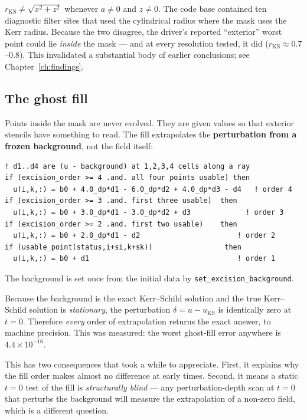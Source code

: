 \documentclass[11pt,openany]{book}
\begin{document}
\gotcha
$r_{\mathrm{KS}} \neq \sqrt{x^2+z^2}$ whenever $a\neq 0$ and $z \neq 0$. The
code base contained ten diagnostic filter sites that used the cylindrical
radius where the mask uses the Kerr radius. Because the two disagree, the
driver's reported ``exterior'' worst point could lie \emph{inside} the mask ---
and at every resolution tested, it did ($r_{\mathrm{KS}} \approx 0.7$--$0.8$).
This invalidated a substantial body of earlier conclusions; see
Chapter~\ref{ch:findings}.

\subsection{The ghost fill}

Points inside the mask are never evolved. They are given values so that
exterior stencils have something to read. The fill extrapolates the
\textbf{perturbation from a frozen background}, not the field itself:

\begin{lstlisting}
! d1..d4 are (u - background) at 1,2,3,4 cells along a ray
if (excision_order >= 4 .and. all four points usable) then
  u(i,k,:) = b0 + 4.0_dp*d1 - 6.0_dp*d2 + 4.0_dp*d3 - d4   ! order 4
if (excision_order >= 3 .and. first three usable)  then
  u(i,k,:) = b0 + 3.0_dp*d1 - 3.0_dp*d2 + d3             ! order 3
if (excision_order >= 2 .and. first two usable)    then
  u(i,k,:) = b0 + 2.0_dp*d1 - d2                       ! order 2
if (usable_point(status,i+si,k+sk))                 then
  u(i,k,:) = b0 + d1                                   ! order 1
\end{lstlisting}

The background is set once from the initial data by
\texttt{set\_excision\_background}.

\gotcha
Because the background is the exact Kerr--Schild solution and the true
Kerr--Schild solution is \emph{stationary}, the perturbation $\delta = u -
u_{\mathrm{KS}}$ is identically zero at $t=0$. Therefore \emph{every} order of
extrapolation returns the exact answer, to machine precision. This was
measured: the worst ghost-fill error anywhere is $4.4\times10^{-16}$.

This has two consequences that took a while to appreciate. First, it explains
why the fill order makes almost no difference at early times. Second, it
means a static $t=0$ test of the fill is \emph{structurally blind} --- any
perturbation-depth scan at $t=0$ that perturbs the background will measure the
extrapolation of a non-zero field, which is a different question.
\end{document}
